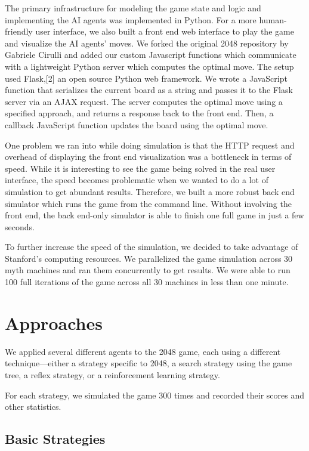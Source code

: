 \documentclass[9pt,twocolumn]{article}
\begin{document}
The primary infrastructure for modeling the game state and logic and implementing the AI agents was implemented in Python. For a more human-friendly user interface, we also built a front end web interface to play the game and visualize the AI agents' moves. We forked the original 2048 repository by Gabriele Cirulli and added our custom Javascript functions which communicate with a lightweight Python server which computes the optimal move. The setup used Flask,[2] an open source Python web framework. We wrote a JavaScript function that serializes the current board as a string and passes it to the Flask server via an AJAX request. The server computes the optimal move using a specified approach, and returns a response back to the front end. Then, a callback JavaScript function updates the board using the optimal move.

One problem we ran into while doing simulation is that the HTTP request and overhead of displaying the front end visualization was a bottleneck in terms of speed. While it is interesting to see the game being solved in the real user interface, the speed becomes problematic when we wanted to do a lot of simulation to get abundant results. Therefore, we built a more robust back end simulator which runs the game from the command line. Without involving the front end, the back end-only simulator is able to finish one full game in just a few seconds.

To further increase the speed of the simulation, we decided to take advantage of Stanford's computing resources. We parallelized the game simulation across 30 myth machines and ran them concurrently to get results. We were able to run 100 full iterations of the game across all 30 machines in less than one minute.

\section{Approaches}

We applied several different agents to the 2048 game, each using a different technique---either a strategy specific to 2048, a search strategy using the game tree, a reflex strategy, or a reinforcement learning strategy.

For each strategy, we simulated the game 300 times and recorded their scores and other statistics.

\subsection{Basic Strategies}
\end{document}
